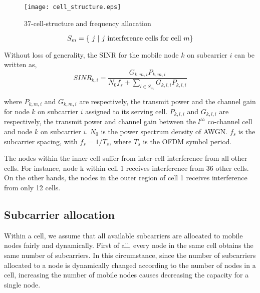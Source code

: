 \documentclass[conference]{IEEEtran}
\begin{document}
 \begin{figure}[tbp]
\centering
\texttt{[image: cell\_structure.eps]}
\caption{37-cell-structure and frequency allocation}
\label{F:cell_structure}
\end{figure}





\begin{displaymath}
S_m = \{~j~|~j~\textrm{interference cells for cell $ m $}\}
\end{displaymath}



Without loss of generality, the SINR for the mobile node \begin{math} k \end{math} on subcarrier \begin{math} i \end{math} can be written as,
\begin{equation}
SINR_{k,i} = \frac{G_{k,m,i}P_{k,m,i}}{N_0 f_s + \sum_{l \in S_m}^{} G_{k,l,i}P_{k,l,i}}
\label{eq:eqs3}
\end{equation}


\noindent where $ P_{k,m,i} $ and $ G_{k,m,i} $ are respectively, the transmit power and the channel gain for node $ k $ on subcarrier $ i $ assigned to its serving cell. $ P_{k,l,i} $ and $ G_{k,l,i} $ are respectively, the transmit power and channel gain between the $ l^{th} $ co-channel cell and node $ k $ on subcarrier $ i $. $ N_0 $ is the power spectrum density of AWGN. $ f_s $ is the subcarrier spacing, with $ f_s = 1/T_s $, where $ T_s $ is the OFDM symbol period.

The nodes within the inner cell suffer from inter-cell interference from all other cells. For instance, node k within cell 1 receives interference from 36 other cells. On the other hands, the nodes in the outer region of cell 1 receives interference from only 12 cells.

\subsection{Subcarrier allocation}

Within a cell, we assume that all available subcarriers are allocated to mobile nodes fairly and dynamically. First of all, every node in the same cell obtains the same number of subcarriers. In this circumstance, since the number of subcarriers allocated to a node is dynamically changed according to the number of nodes in a cell, increasing the number of mobile nodes causes decreasing the capacity for a single node.
\end{document}
